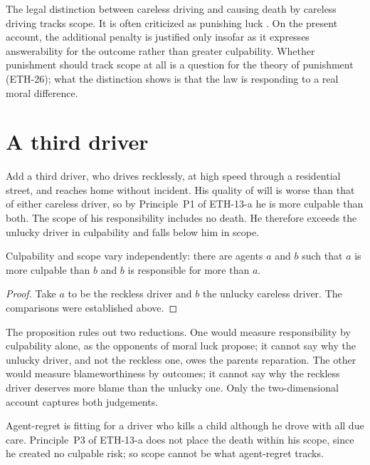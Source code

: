\documentclass{situationist-preprint}
\begin{document}
The legal distinction between careless driving and causing death by careless driving tracks scope. It is often criticized as punishing luck \citep{EnochMarmor2007}. On the present account, the additional penalty is justified only insofar as it expresses answerability for the outcome rather than greater culpability. Whether punishment should track scope at all is a question for the theory of punishment (ETH-26); what the distinction shows is that the law is responding to a real moral difference.

\section{A third driver}

Add a third driver, who drives recklessly, at high speed through a residential street, and reaches home without incident. His quality of will is worse than that of either careless driver, so by Principle~P1 of ETH-13-a he is more culpable than both. The scope of his responsibility includes no death. He therefore exceeds the unlucky driver in culpability and falls below him in scope.

\begin{proposition}\label{p:indep}
Culpability and scope vary independently: there are agents $a$ and $b$ such that $a$ is more culpable than $b$ and $b$ is responsible for more than $a$.
\end{proposition}

\begin{proof}
Take $a$ to be the reckless driver and $b$ the unlucky careless driver. The comparisons were established above.
\end{proof}

The proposition rules out two reductions. One would measure responsibility by culpability alone, as the opponents of moral luck propose; it cannot say why the unlucky driver, and not the reckless one, owes the parents reparation. The other would measure blameworthiness by outcomes; it cannot say why the reckless driver deserves more blame than the unlucky one. Only the two-dimensional account captures both judgements.

\begin{objection}
Agent-regret is fitting for a driver who kills a child although he drove with all due care. Principle~P3 of ETH-13-a does not place the death within his scope, since he created no culpable risk; so scope cannot be what agent-regret tracks.
\end{objection}
\end{document}
